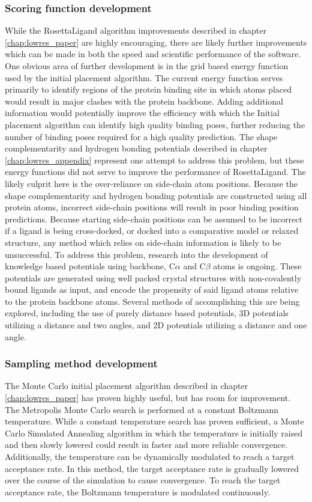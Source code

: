 \subsubsection{Scoring function development}
While the RosettaLigand algorithm improvements described in chapter \ref{chap:lowres_paper} are highly encouraging, there are likely further improvements which can be made in both the speed and scientific performance of the software.
One obvious area of further development is in the grid based energy function used by the initial placement algorithm.
The current energy function serves primarily to identify regions of the protein binding site in which atoms placed would result in major clashes with the protein backbone.  
Adding additional information would potentially improve the efficiency with which the Initial placement algorithm can identify high quality binding poses, further reducing the number of binding poses required for a high quality prediction.
The shape complementarity and hydrogen bonding potentials described in chapter \ref{chap:lowres_appendix} represent one attempt to address this problem, but these energy functions did not serve to improve the performance of RosettaLigand.
The likely culprit here is the over-reliance on side-chain atom positions.
Because the shape complementarity and hydrogen bonding potentials are constructed using all protein atoms, incorrect side-chain positions will result in poor binding position predictions.
Because starting side-chain positions can be assumed to be incorrect if a ligand is being cross-docked, or docked into a comparative model or relaxed structure, any method which relies on side-chain information is likely to be unsuccessful.
To address this problem, research into the development of knowledge based potentials using backbone, C$\alpha$ and C$\beta$ atoms is ongoing.
These potentials are generated using well packed crystal structures with non-covalently bound ligands as input, and encode the propensity of said ligand atoms relative to the protein backbone atoms.
Several methods of accomplishing this are being explored, including the use of purely distance based potentials, 3D potentials utilizing a distance and two angles, and 2D potentials utilizing a distance and one angle.

\subsubsection{Sampling method development}
The Monte Carlo initial placement algorithm described in chapter \ref{chap:lowres_paper} has proven highly useful, but has room for improvement.
The Metropolis Monte Carlo search is performed at a constant Boltzmann temperature.
While a constant temperature search has proven sufficient, a Monte Carlo Simulated Annealing algorithm in which the temperature is initially raised and then slowly lowered could result in faster and more reliable convergence. 
Additionally, the temperature can be dynamically modulated to reach a target acceptance rate.
In this method, the target acceptance rate is gradually lowered over the course of the simulation to cause convergence.
To reach the target acceptance rate, the Boltzmann temperature is modulated continuously.

